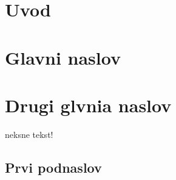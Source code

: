 
\chapter*{Uvod}



\chapter{Glavni naslov}

\chapter{Drugi glvnia naslov}
\label{chap:2.naslov}

neksne tekst!


\section{Prvi podnaslov}
\label{sec:1.podnaslov}

